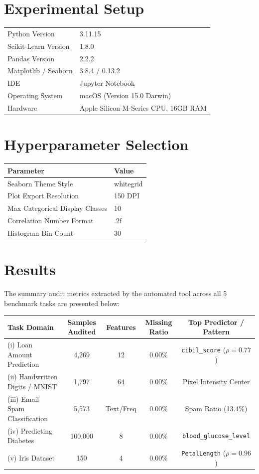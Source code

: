 \documentclass[12pt,a4paper]{article}
\begin{document}
\section{Experimental Setup}
\begin{tabular}{ll}
\toprule
Python Version & 3.11.15 \\
Scikit-Learn Version & 1.8.0 \\
Pandas Version & 2.2.2 \\
Matplotlib / Seaborn & 3.8.4 / 0.13.2 \\
IDE & Jupyter Notebook \\
Operating System & macOS (Version 15.0 Darwin) \\
Hardware & Apple Silicon M-Series CPU, 16GB RAM \\
\bottomrule
\end{tabular}

\section{Hyperparameter Selection}
\begin{tabular}{ll}
\toprule
Parameter & Value\\
\midrule
Seaborn Theme Style & whitegrid \\
Plot Export Resolution & 150 DPI \\
Max Categorical Display Classes & 10 \\
Correlation Number Format & .2f \\
Histogram Bin Count & 30 \\
\bottomrule
\end{tabular}

\section{Results}
The summary audit metrics extracted by the automated tool across all 5 benchmark tasks are presented below:

\begin{tabular}{lcccc}
\toprule
Task Domain & Samples Audited & Features & Missing Ratio & Top Predictor / Pattern \\
\midrule
(i) Loan Amount Prediction & 4,269 & 12 & 0.00\% & \texttt{cibil\_score} ($\rho=0.77$) \\
(ii) Handwritten Digits / MNIST & 1,797 & 64 & 0.00\% & Pixel Intensity Center \\
(iii) Email Spam Classification & 5,573 & Text/Freq & 0.00\% & Spam Ratio (13.4\%) \\
(iv) Predicting Diabetes & 100,000 & 8 & 0.00\% & \texttt{blood\_glucose\_level} \\
(v) Iris Dataset & 150 & 4 & 0.00\% & \texttt{PetalLength} ($\rho=0.96$) \\
\bottomrule
\end{tabular}
\end{document}
